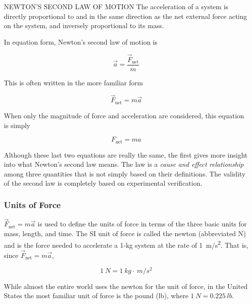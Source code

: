 \documentclass[../../main-ap-physics.tex]{subfiles}
\begin{document}
\begin{gradient}{NEWTON'S SECOND LAW OF MOTION}
    The acceleration of a system is directly proportional to and in the same direction as the net external force acting on the system, and inversely proportional to its mass.

    \vspace{1em}

    In equation form, Newton's second law of motion is

    \begin{equation}
        \vec{a} = \frac{\vec{F}_{\text{net}}}{m}
    \end{equation}

    This is often written in the more familiar form

    \begin{equation}
        \vec{F}_{\text{net}} = m \vec{a}
    \end{equation}

    When only the magnitude of force and acceleration are considered, this equation is simply

    \begin{equation*}
        F_{\text{net}} = m a
    \end{equation*}
\end{gradient}

Although these last two equations are really the same, the first gives more insight into what Newton’s second law means. The law is a \textit{cause and effect relationship} among three quantities that is not simply based on their definitions. The validity of the second law is completely based on experimental verification.

\subsubsection*{Units of Force}

$\vec{F}_{\text{net}} = m \vec{a}$ is used to define the units of force in terms of the three basic units for mass, length, and time. The SI unit of force is called the \gls{newton} (abbreviated N) and is the force needed to accelerate a 1-kg system at the rate of \SI{1}{m/s^2}. That is, since $\vec{F}_{\text{net}} = m \vec{a}$,

\begin{equation}
    \SI{1}{N} = \SI{1}{kg} \cdot \SI{}{m/s^2}
\end{equation}

While almost the entire world uses the newton for the unit of force, in the United States the most familiar unit of force is the pound (lb), where $\SI{1}{N} = \SI{0.225}{lb}$.
\end{document}
